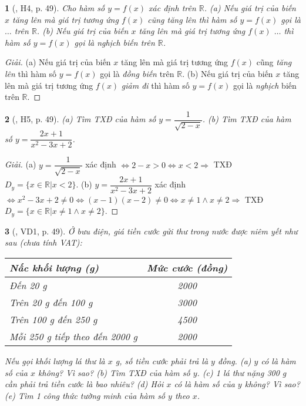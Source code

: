 \documentclass{article}
\newtheorem{baitoan}{}
\begin{document}
\begin{baitoan}[\cite{Binh_boi_duong_Toan_9_tap_1}, H4, p. 49]
	Cho hàm số $y = f(x)$ xác định trên $\mathbb{R}$. (a) Nếu giá trị của biến $x$ tăng lên mà giá trị tương ứng $f(x)$ cũng tăng lên thì hàm số $y = f(x)$ gọi là $\ldots$ trên $\mathbb{R}$. (b) Nếu giá trị của biến $x$ tăng lên mà giá trị tương ứng $f(x)$ $\ldots$ thì hàm số $y = f(x)$ gọi là nghịch biến trên $\mathbb{R}$.
\end{baitoan}

\begin{proof}[Giải]
	(a) Nếu giá trị của biến $x$ tăng lên mà giá trị tương ứng $f(x)$ cũng \textit{tăng lên} thì hàm số $y = f(x)$ gọi là \textit{đồng biến} trên $\mathbb{R}$. (b) Nếu giá trị của biến $x$ tăng lên mà giá trị tương ứng $f(x)$ \textit{giảm đi} thì hàm số $y = f(x)$ gọi là \textit{nghịch} biến trên $\mathbb{R}$.
\end{proof}

\begin{baitoan}[\cite{Binh_boi_duong_Toan_9_tap_1}, H5, p. 49]
	(a) Tìm {\rm TXĐ} của hàm số $y = \dfrac{1}{\sqrt{2 - x}}$. (b) Tìm {\rm TXĐ} của hàm số $y = \dfrac{2x + 1}{x^2 - 3x + 2}$.
\end{baitoan}

\begin{proof}[Giải]
	(a) $y = \dfrac{1}{\sqrt{2 - x}}$ xác định $\Leftrightarrow2 - x > 0\Leftrightarrow x < 2\Rightarrow$ TXĐ $D_y = \{x\in\mathbb{R}|x < 2\}$. (b) $y = \dfrac{2x + 1}{x^2 - 3x + 2}$ xác định $\Leftrightarrow x^2 - 3x + 2\ne0\Leftrightarrow(x - 1)(x - 2)\ne0\Leftrightarrow x\ne1\land x\ne2\Rightarrow$ TXĐ $D_y = \{x\in\mathbb{R}|x\ne1\land x\ne2\}$.
\end{proof}

\begin{baitoan}[\cite{Binh_boi_duong_Toan_9_tap_1}, VD1, p. 49]
	Ở bưu điện, giá tiền cước gửi thư trong nước được niêm yết như sau (chưa tính {\rm VAT}):
	\begin{table}[H]
		\centering
		\begin{tabular}{|l|c|}
			\hline
			Nấc khối lượng (g) & Mức cước (đồng) \\
			\hline
			Đến 20 g & 2000 \\
			\hline
			Trên 20 g đến 100 g & 3000 \\
			\hline
			Trên 100 g đến 250 g & 4500 \\
			\hline
			Mỗi 250 g tiếp theo đến 2000 g & 2000 \\
			\hline
		\end{tabular}
	\end{table}
	\noindent Nếu gọi khối lượng lá thư là $x$ {\rm g}, số tiền cước phải trả là $y$ đồng. (a) $y$ có là hàm số của $x$ không? Vì sao? (b) Tìm {\rm TXĐ} của hàm số $y$. (c) 1 lá thư nặng {\rm300 g} cần phải trả tiền cước là bao nhiêu? (d) Hỏi $x$ có là hàm số của $y$ không? Vì sao? (e) Tìm 1 công thức tường minh của hàm số $y$ theo $x$.
\end{baitoan}
\end{document}
